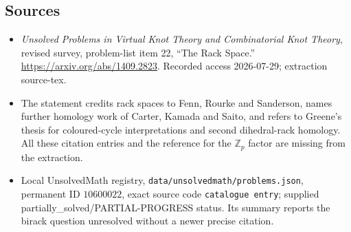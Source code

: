 \documentclass[11pt]{article}
\newcommand{\Z}{\mathbb{Z}}
\begin{document}
\subsection{Sources}
\begin{itemize}
\item \emph{Unsolved Problems in Virtual Knot Theory and Combinatorial Knot Theory}, revised survey, problem-list item 22, ``The Rack Space.'' \url{https://arxiv.org/abs/1409.2823}. Recorded access 2026-07-29; extraction source-tex.
\item The statement credits rack spaces to Fenn, Rourke and Sanderson, names further homology work of Carter, Kamada and Saito, and refers to Greene's thesis for coloured-cycle interpretations and second dihedral-rack homology. All these citation entries and the reference for the \(\Z_p\) factor are missing from the extraction.
\item Local UnsolvedMath registry, \texttt{data/unsolvedmath/problems.json}, permanent ID \(10600022\), exact source code \texttt{catalogue entry}; supplied partially\_solved/PARTIAL-PROGRESS status. Its summary reports the birack question unresolved without a newer precise citation.
\end{itemize}
\end{document}
